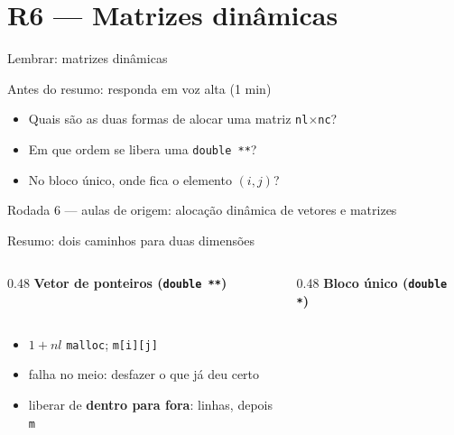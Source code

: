 \documentclass[aspectratio=169]{beamer}
\newcommand{\rodada}[4]{%
  \begin{frame}{Lembrar: #2}
    \begin{block}{Antes do resumo: responda em voz alta (1 min)}
      #4
    \end{block}
    \vfill
    {\small\textcolor{UFSGray}{Rodada #1 --- aulas de origem:} #3}
  \end{frame}}
\begin{document}
\section{R6 --- Matrizes dinâmicas}

\rodada{6}{matrizes dinâmicas}{alocação dinâmica de vetores e matrizes}{
  \begin{itemize}
    \item Quais são as duas formas de alocar uma matriz \texttt{nl}$\times$\texttt{nc}?
    \item Em que ordem se libera uma \texttt{double **}?
    \item No bloco único, onde fica o elemento $(i, j)$?
  \end{itemize}}

\begin{frame}{Resumo: dois caminhos para duas dimensões}
  \begin{columns}[T]
    \begin{column}{0.48\textwidth}
      \centering\textbf{\small Vetor de ponteiros (\texttt{double **})}\\[0.3em]
      \\[0.3em]
      \begin{itemize}\scriptsize
        \item $1 + nl$ \texttt{malloc}; \texttt{m[i][j]}
        \item falha no meio: desfazer o que já deu certo
        \item liberar de \textbf{dentro para fora}: linhas, depois \texttt{m}
      \end{itemize}
    \end{column}
    \begin{column}{0.48\textwidth}
      \centering\textbf{\small Bloco único (\texttt{double *})}\\[0.3em]
\end{column}
\end{columns}
\end{frame}
\end{document}
